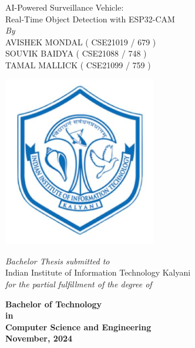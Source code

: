 \documentclass[12pt,a4paper]{report}
\newcommand{\mytitle}{AI-Powered Surveillance Vehicle:
Real-Time Object Detection with ESP32-CAM}
\newcommand{\mySpace}{0.5cm}
\newcommand{\mySpaceHalf}{0.5cm}
\begin{document}
\clearpage
	\begin{titlepage}

    \centering

{\Huge AI-Powered Surveillance Vehicle:\\[0.5cm]Real-Time Object Detection with ESP32-CAM \fontsize{24}{28.8}\selectfont 
{}\selectfont}\\
    
    
\vspace{\mySpace}
    \large \textit{By}\\
\vspace{\mySpace}
    {\Large AVISHEK MONDAL ( CSE21019 / 679 )  \\
    \vspace{0.1cm}
    SOUVIK BAIDYA ( CSE21088  / 748 )\\
    \vspace{0.1cm}
    TAMAL MALLICK ( CSE21099 / 759 ) \\
    \fontsize{18}{22}\selectfont {}\selectfont
\vspace{\mySpace}}
    \begin{center}
        \includegraphics[width=0.5\textwidth]{iiitk_logo} %
    \end{center}
    {\Large \textit{Bachelor Thesis submitted to}\\
    \vspace{\mySpaceHalf}
    Indian Institute of Information Technology Kalyani \\ \vspace{\mySpaceHalf}
	 \textit{for the partial fulfillment of the degree of}\\ \vspace{\mySpaceHalf}

{\bfseries %
	 Bachelor of Technology \\ 
	 in \\
	 Computer Science and Engineering\\ \vspace{\mySpaceHalf}
	  November, 2024 \fontsize{18}{22}}\selectfont {}\selectfont}
    \vspace*{\fill}
\end{titlepage}
\end{document}
